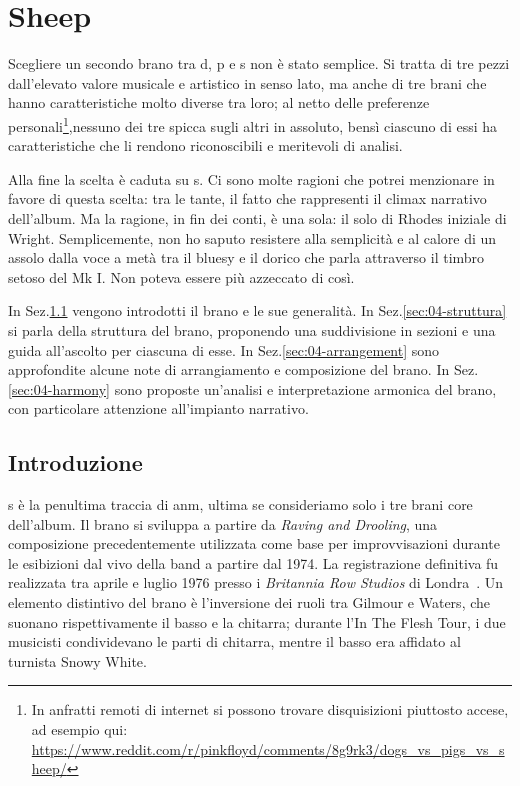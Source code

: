 \documentclass[class=book, crop=false, oneside, 12pt]{standalone}
\begin{document}
    \chapter{Sheep}
    \label{ch:04-sheep}

    Scegliere un secondo brano tra \acrshort{d}, \acrshort{p} e \acrshort{s} non è stato semplice. Si tratta di tre pezzi dall'elevato valore musicale e artistico in senso lato, ma anche di tre brani che hanno caratteristiche molto diverse tra loro; al netto delle preferenze personali\footnote{In anfratti remoti di internet si possono trovare disquisizioni piuttosto accese, ad esempio qui: \url{https://www.reddit.com/r/pinkfloyd/comments/8g9rk3/dogs_vs_pigs_vs_sheep/}},nessuno dei tre spicca sugli altri in assoluto, bensì ciascuno di essi ha caratteristiche che li rendono riconoscibili e meritevoli di analisi.

    Alla fine la scelta è caduta su \acrshort{s}. Ci sono molte ragioni che potrei menzionare in favore di questa scelta: tra le tante, il fatto che rappresenti il climax narrativo dell'album. Ma la ragione, in fin dei conti, è una sola: il solo di Rhodes iniziale di Wright. Semplicemente, non ho saputo resistere alla semplicità e al calore di un assolo dalla voce a metà tra il bluesy e il dorico che parla attraverso il timbro setoso del Mk I. Non poteva essere più azzeccato di così.

    In Sez.\ref{sec:04-intro} vengono introdotti il brano e le sue generalità. In Sez.\ref{sec:04-struttura} si parla della struttura del brano, proponendo una suddivisione in sezioni e una guida all'ascolto per ciascuna di esse. In Sez.\ref{sec:04-arrangement} sono approfondite alcune note di arrangiamento e composizione  del brano. In Sez.\ref{sec:04-harmony} sono proposte un'analisi e interpretazione armonica del brano, con particolare attenzione all'impianto narrativo.

    \section{Introduzione}
    \label{sec:04-intro}

    \acrlong{s} è la penultima traccia di \acrshort{anm}, ultima se consideriamo solo i tre brani core dell'album. 
    Il brano si sviluppa a partire da \emph{Raving and Drooling}, una composizione precedentemente utilizzata come base per improvvisazioni durante le esibizioni dal vivo della band a partire dal 1974. La registrazione definitiva fu realizzata tra aprile e luglio 1976 presso i \emph{Britannia Row Studios} di Londra~\cite{mabbett2010pink}. Un elemento distintivo del brano è l'inversione dei ruoli tra Gilmour e Waters, che suonano rispettivamente il basso e la chitarra; durante l'In The Flesh Tour, i due musicisti condividevano le parti di chitarra, mentre il basso era affidato al turnista Snowy White.
\end{document}
